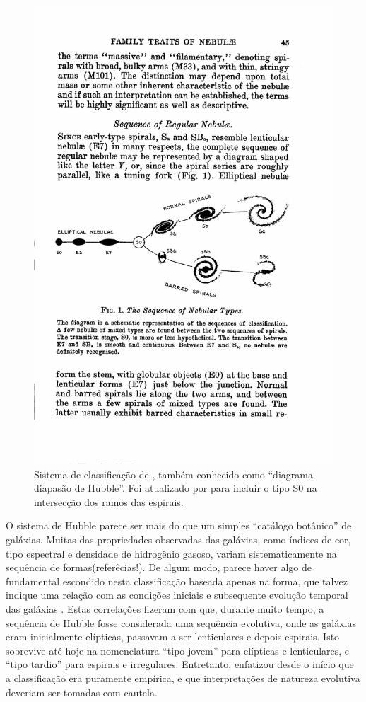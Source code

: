\begin{figure}
	\includegraphics[width=1.0\textwidth]{figuras/HubbleSequence}
	\caption[Classificação de Hubble.]
	{Sistema de classificação de \citet{hubble1936}, também conhecido como
	``diagrama diapasão de Hubble''. Foi atualizado por
	\citet{Sandage1975} para incluir o tipo S0 na intersecção dos
	ramos das espirais.}
	\label{fig:HubbleSequence}
\end{figure}

O sistema de Hubble parece ser mais do que um simples ``catálogo botânico'' de
galáxias. Muitas das propriedades observadas das galáxias, como índices de cor,
tipo espectral e densidade de hidrogênio gasoso, variam sistematicamente na
sequência de formas\fixme(referêcias!). De algum modo, parece haver algo de
fundamental escondido nesta classificação baseada apenas na forma, que talvez
indique uma relação com as condições iniciais e subsequente evolução temporal
das galáxias \citep{Sandage1975}. Estas correlações fizeram com que, durante
muito tempo, a sequência de Hubble fosse considerada uma sequência evolutiva,
onde as galáxias eram inicialmente elípticas, passavam a ser lenticulares e
depois espirais. Isto sobrevive até hoje na nomenclatura ``tipo jovem'' para
elípticas e lenticulares, e ``tipo tardio'' para espirais e irregulares.
Entretanto, \citet{Hubble1927} enfatizou desde o início que a classificação era
puramente empírica, e que interpretações de natureza evolutiva deveriam ser
tomadas com cautela.



